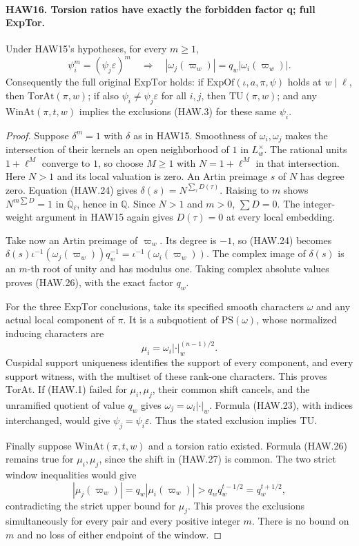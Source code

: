 \paragraph{HAW16. Torsion ratios have exactly the forbidden factor q; full ExpTor.}
\label{claim:HAW16}
Under HAW15's hypotheses, for every $m\ge1$,
\[
 \psi_i^m=(\psi_j\varepsilon)^m
       \quad\Longrightarrow\quad
                   |\omega_j(\varpi_w)|=q_w|\omega_i(\varpi_w)|.
 \tag{HAW.26}
\]
Consequently the full original $\mathrm{ExpTor}$ holds:
if $\mathrm{ExpOf}(\iota,a,\pi,\psi)$ holds at $w\mid\ell$,
then $\mathrm{TorAt}(\pi,w)$; if also
$\psi_i\ne\psi_j\varepsilon$ for all $i,j$, then
$\mathrm{TU}(\pi,w)$; and any $\mathrm{WinAt}(\pi,t,w)$
implies the exclusions (HAW.3) for these same $\psi_i$.
\begin{proof}
Suppose $\delta^m=1$ with $\delta$ as in HAW15.
Smoothness of $\omega_i,\omega_j$ makes the intersection
of their kernels an open neighborhood of $1$ in
$L_w^\times$.  The rational units $1+\ell^M$ converge to
$1$, so choose $M\ge1$ with $N=1+\ell^M$ in that
intersection.  Here $N>1$ and its local valuation is zero.
An Artin preimage $s$ of $N$ has degree zero.
Equation (HAW.24) gives $\delta(s)=N^{\sum_\tau D(\tau)}$.
Raising to $m$ shows $N^{m\sum D}=1$ in
$\overline{\mathbb Q}_\ell$, hence in $\mathbb Q$.
Since $N>1$ and $m>0$, $\sum D=0$.  The integer-weight
argument in HAW15 again gives $D(\tau)=0$ at every local
embedding.

Take now an Artin preimage of $\varpi_w$.  Its degree is
$-1$, so (HAW.24) becomes
$\delta(s)\iota^{-1}(\omega_j(\varpi_w))q_w^{-1}
=\iota^{-1}(\omega_i(\varpi_w))$.
The complex image of $\delta(s)$ is an $m$-th root of unity
and has modulus one.  Taking complex absolute values proves
(HAW.26), with the exact factor $q_w$.

For the three $\mathrm{ExpTor}$ conclusions, take its
specified smooth characters $\omega$ and any actual local
component of $\pi$.  It is a subquotient of
$\mathrm{PS}(\omega)$, whose normalized inducing characters
are
\[
             \mu_i=\omega_i|\cdot|_w^{(n-1)/2}.
 \tag{HAW.27}
\]
Cuspidal support uniqueness identifies the support of every
component, and every support witness, with the multiset of
these rank-one characters.  This proves $\mathrm{TorAt}$.
If (HAW.1) failed for $\mu_i,\mu_j$, their common shift
cancels, and the unramified quotient of value $q_w$ gives
$\omega_j=\omega_i|\cdot|_w$.  Formula (HAW.23), with
indices interchanged, would give
$\psi_j=\psi_i\varepsilon$.  Thus the stated exclusion
implies $\mathrm{TU}$.

Finally suppose $\mathrm{WinAt}(\pi,t,w)$ and a torsion
ratio existed.  Formula (HAW.26) remains true for $\mu_i,
\mu_j$, since the shift in (HAW.27) is common.  The two
strict window inequalities would give
\[
 |\mu_j(\varpi_w)|=q_w|\mu_i(\varpi_w)|
       >q_wq_w^{t-1/2}=q_w^{t+1/2},
\]
contradicting the strict upper bound for $\mu_j$.
This proves the exclusions simultaneously for every pair
and every positive integer $m$.  There is no bound on $m$
and no loss of either endpoint of the window.
\end{proof}

